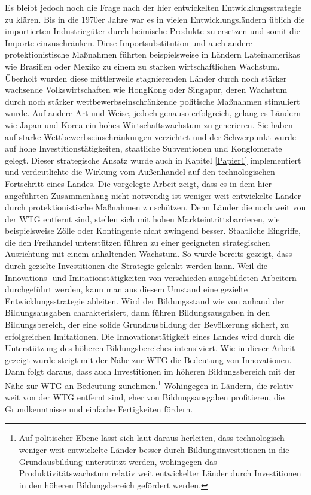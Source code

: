 Es bleibt jedoch noch die Frage nach der hier entwickelten Entwicklungsstrategie zu kl{\"a}ren. Bis in die 1970er Jahre war es in vielen Entwicklungsl{\"a}ndern {\"u}blich die importierten Industrieg{\"u}ter durch heimische Produkte zu ersetzen und somit die Importe einzuschr{\"a}nken. Diese Importsubstitution und auch andere protektionistische Ma{\ss}nahmen f{\"u}hrten beispielsweise in L{\"a}ndern Lateinamerikas wie Brasilien oder Mexiko zu einem zu starken wirtschaftlichen  Wachstum. {\"U}berholt wurden diese mittlerweile stagnierenden L{\"a}nder durch noch st{\"a}rker wachsende Volkswirtschaften wie HongKong oder Singapur, deren Wachstum durch noch st{\"a}rker wettbewerbseinschr{\"a}nkende politische Ma{\ss}nahmen stimuliert wurde. Auf andere Art und Weise, jedoch genauso erfolgreich, gelang es L{\"a}ndern wie Japan und Korea ein hohes Wirtschaftswachstum zu generieren. Sie haben auf starke Wettbewerbseinschr{\"a}nkungen verzichtet und der Schwerpunkt wurde auf hohe Investitionst{\"a}tigkeiten, staatliche Subventionen und Konglomerate gelegt. Dieser strategische Ansatz wurde auch in Kapitel \ref{Papier1} implementiert und verdeutlichte die Wirkung vom Au{\ss}enhandel auf den technologischen Fortschritt eines Landes.\newline
Die vorgelegte Arbeit zeigt, dass es in dem hier angef{\"u}hrten Zusammenhang nicht notwendig ist weniger weit entwickelte L{\"a}nder durch protektionistische Ma{\ss}nahmen zu sch{\"u}tzen. Denn 
L{\"a}nder die noch weit von der WTG entfernt sind, stellen sich mit hohen Markteintrittsbarrieren, wie beispielsweise Z{\"o}lle oder Kontingente nicht zwingend besser. Staatliche Eingriffe, die den Freihandel unterst{\"u}tzen f{\"u}hren zu einer geeigneten strategischen Ausrichtung mit einem anhaltenden Wachstum. So wurde bereits gezeigt, dass durch gezielte Investitionen die Strategie gelenkt werden kann. Weil die Innovations- und Imitationst{\"a}tigkeiten von verschieden ausgebildeten Arbeitern durchgef{\"u}hrt werden, kann man aus diesem Umstand eine gezielte Entwicklungsstrategie ableiten. Wird der Bildungsstand wie von \citet{Benhabib.1994} anhand der Bildungsausgaben charakterisiert, dann f{\"u}hren Bildungsausgaben in den Bildungsbereich, der eine solide Grundausbildung der Bev{\"o}lkerung sichert, zu erfolgreichen Imitationen. Die Innovationst{\"a}tigkeit eines Landes wird durch die Unterst{\"u}tzung des h{\"o}heren Bildungsbereiches intensiviert. Wie in dieser Arbeit gezeigt wurde steigt mit der N{\"a}he zur WTG die Bedeutung von Innovationen. Dann folgt daraus, dass auch Investitionen im h{\"o}heren Bildungsbereich mit der N{\"a}he zur WTG an Bedeutung zunehmen.\footnote{Auf politischer Ebene l{\"a}sst sich laut \citet{Vandenbussche.2006} daraus herleiten, dass technologisch weniger weit entwickelte L{\"a}nder besser durch Bildungsinvestitionen in die Grundausbildung unterst{\"u}tzt werden, wohingegen das Produktivit{\"a}tswachstum relativ weit entwickelter L{\"a}nder durch Investitionen in den h{\"o}heren Bildungsbereich gef{\"o}rdert werden.}
Wohingegen in L{\"a}ndern, die relativ weit von der WTG entfernt sind, eher von Bildungsausgaben profitieren, die Grundkenntnisse und einfache Fertigkeiten f{\"o}rdern.\\

